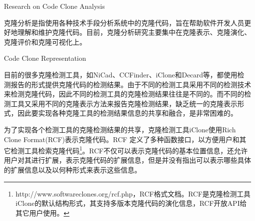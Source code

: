 
{ Research on Code Clone Analysis}

克隆分析是指使用各种技术手段分析系统中的克隆代码，旨在帮助软件开发人员更好地理解和维护克隆代码。目前，克隆分析研究主要集中在克隆表示、克隆演化、克隆评价和克隆可视化上。

{Code Clone Representation}


目前的很多克隆检测工具，如NiCad、CCFinder、iClone和Decard等，都使用检测报告的形式提供克隆代码的检测结果。由于不同的检测工具采用不同的检测技术来检测克隆代码，因此不同的检测工具的克隆检测结果往往是不同的。而不同的检测工具又采用不同的克隆表示方法来报告克隆检测结果，缺乏统一的克隆表示形式，因此要实现各种克隆工具的检测结果信息的共享和融合，是非常困难的。

为了实现各个检测工具的克隆检测结果的共享，克隆检测工具iClone使用Rich Clone Format(RCF)表示克隆代码\cite{harder2011efficiently}。RCF 定义了多种函数接口，以方便用户和其它检测工具检索克隆代码\footnote{http://www.softwareclones.org/rcf.php，RCF格式文档。RCF是克隆检测工具iClone的默认结构形式，其支持多版本克隆代码的演化信息，RCF开放API给其它用户使用。}。RCF不仅可以表示克隆代码的基本位置信息，还允许用户对其进行扩展，表示克隆代码的扩展信息，但是并没有指出可以表示哪些具体的扩展信息以及以何种形式来表示这些信息。%

